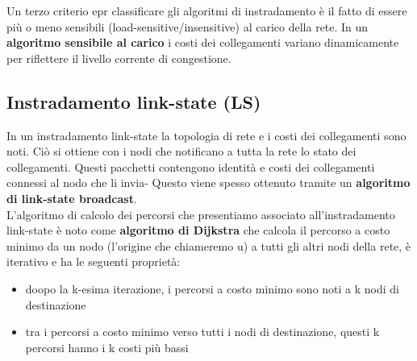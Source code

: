 \documentclass[11pt,a4paper]{book}
\begin{document}
Un terzo criterio epr classificare gli algoritmi di instradamento è il fatto di essere più o meno sensibili (load-sensitive/insensitive) al carico della rete. In un \textbf{algoritmo sensibile al carico} i costi dei collegamenti variano dinamicamente per riflettere il livello corrente di congestione.
\subsection{Instradamento link-state (LS)}
In un instradamento link-state la topologia di rete e i costi dei collegamenti sono noti. Ciò si ottiene con i nodi che notificano a tutta la rete lo stato dei collegamenti. Questi pacchetti contengono identità e costi dei collegamenti connessi al nodo che li invia- Questo viene spesso ottenuto tramite un \textbf{algoritmo di link-state broadcast}.\\
L'algoritmo di calcolo dei percorsi che presentiamo associato all'instradamento link-state è noto come \textbf{algoritmo di Dijkstra} che calcola il percorso a costo minimo da un nodo (l'origine che chiameremo u) a tutti gli altri nodi della rete, è iterativo e ha le seguenti proprietà:
\begin{itemize}
	\item doopo la k-esima iterazione, i percorsi a costo minimo sono noti a k nodi di destinazione
	\item tra i percorsi a costo minimo verso tutti i nodi di destinazione, questi k percorsi hanno i k costi più bassi
\end{itemize}
\end{document}
